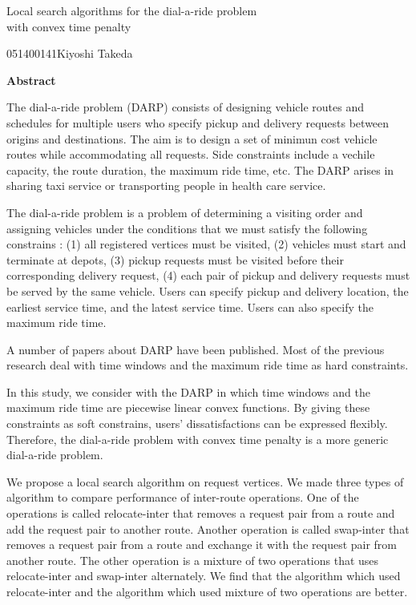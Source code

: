

\newpage
\begin{center}{\LARGE Local  search algorithms for the dial-a-ride problem\\ with convex time penalty}\\[0.5cm]
\end{center}
\hfill {\large 051400141\qquad Kiyoshi Takeda}\\[0.5cm]
\begin{center}
{\large \bf Abstract}\\
\end{center}
The dial-a-ride problem (DARP) consists of designing vehicle routes and schedules for multiple users who specify pickup and delivery requests between origins and destinations. The aim is to design a set of minimun cost vehicle routes while accommodating all requests. Side constraints include a vechile capacity, the route duration, the maximum ride time, etc. The DARP arises in sharing taxi service or transporting people in health care service.

The dial-a-ride problem is a problem of determining a visiting order and assigning vehicles under the conditions that we must satisfy the following constrains : (1) all registered vertices must be visited, (2) vehicles must start and terminate at depots, (3) pickup requests must be visited before their corresponding delivery request, (4) each pair of pickup and delivery requests must be served by the same vehicle.  Users can specify pickup and delivery location, the earliest service time, and the latest service time. Users can also specify the maximum ride time.

A number of papers about DARP have been published. Most of the previous research deal with time windows and the maximum ride time as hard constraints.

In this study, we consider with the DARP in which time windows and the maximum ride time are piecewise linear convex functions. By giving these constraints as soft constrains, users' dissatisfactions can be expressed flexibly. Therefore, the dial-a-ride problem with convex time penalty is a more generic dial-a-ride problem.

We propose a local search algorithm on request vertices. We made three types of algorithm to compare performance of inter-route operations.
One of the operations is called relocate-inter that removes a request pair from a route and add the request pair to another route. Another operation is called swap-inter that removes a request pair from a route and exchange it with the request pair from another route. The other operation is a mixture of two operations that uses relocate-inter and swap-inter alternately.
We find that the algorithm which used relocate-inter and the algorithm which used mixture of two operations are better.

